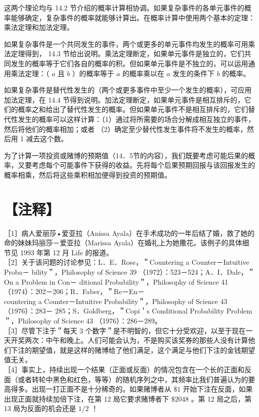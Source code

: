 这两个理论均与 14.2 节介绍的概率计算相协调。如果复杂事件的各单元事件的概率能够确定，复杂事件的概率就能够计算出。在概率计算中使用两个基本的定理：乘法定理和加法定理。

如果复杂事件是一个共同发生的事件，两个或更多的单元事件均发生的概率可用乘法定理得到， 14.3 节给出说明。乘法定理断定，如果单元事件是独立的，它们共同发生的概率等于它们各自的概率的积。但如果单元事件是不独立的，可以运用通用乘法定理：（ $a$ 且 $b$ ）的概率等于 $a$ 的概率乘以在 $a$ 发生的条件下 $b$ 的概率。

如果复杂事件是替代性发生的（两个或更多事件中至少一个发生的概率），可应用加法定理，在 14.4 节得到说明。加法定理断定，如果单元事件是相互排斥的，它们的概率之和给出了替代性发生的概率。但如果单元事件不是相互排斥的，它们替代性发生的概率可以这样计算：（1）通过将所需要的场合分解成相互独立的事件，然后将他们的概率相加；或者 （2）确定至少替代性发生事件将不发生的概率，然后用 1 减去这个数。

为了计算一项投资或赌博的预期值（14．5节的内容），我们既要考虑可能后果的概率，又要考虑每个可能事件下获得的收益。先将每个后果预期回报与该回报发生的概率相乘，然后将这些乘积相加便得到投资的预期值。

\section*{【注释】}
［1］病人爱丽莎•爱亚拉（Anissa Ayala）在手术成功的一年后结了婚，救了她的命的妹妹玛丽莎－爱亚拉（Marissa Ayala）在婚礼上为她撒花。该例子的具体细节见 1993 年第 12 月 Life 的报道。\\
［2］关于该问题的讨论参见：L．E．Rose，＂Countering a Counter－Intuitive Proba－ bility＂，Philosophy of Science 39 （1972）：523－524；A．I．Dale，＂On a Problem in Con－ ditional Probability＂，Philosophy of Science 41 （1974）：202－206；R．Faber，＂Re－En－\\
countering a Counter－Intuitive Probability＂，Philosophy of Science 43 （1976）：283－ 285；S．Goldberg，＂Copi＇s Conditional Probability Problem＂，Philosophy of Science 43 （1976）：286－289。\\
［3］尽管下注于＂每天 3 个数字＂是不明智的，但它十分受欢迎，以至于现在一天开奖两次：中午和晚上。人们可能会认为，不是购买该奖券的那些人没有计算他们下注的期望值，就是这样的赌博给了他们满足，这个满足与他们下注的金钱期望值无关。\\
［4］事实上，持续出现一个结果（正面或反面）的情况包含在一个长的正面和反面（或者转轮中黑色和红色，等等）的随机序列之中，其频率比我们普遍认为的要高得多。出现一打正面不是十分稀奇的。如果赌博者从 $\$ 1$ 开始下注在反面，如果出现正面就持续加倍下注，在第 12 局它要求赌博者下 $\$ 2048$ 。第 12 局之后，第 13 局为反面的机会还是 $1 / 2$ ！

